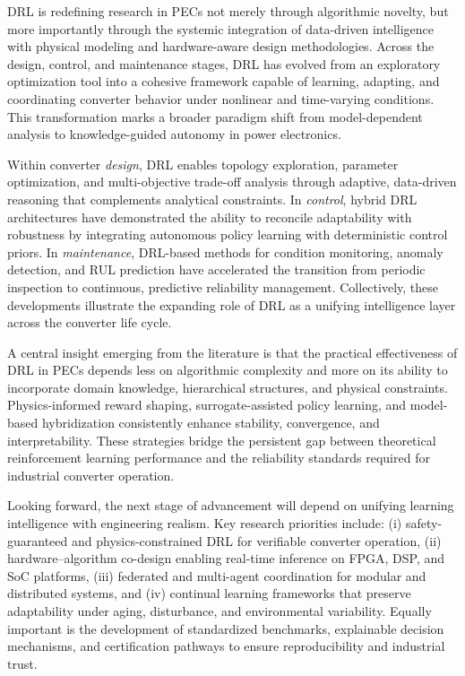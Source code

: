 
DRL is redefining research in PECs not merely through algorithmic novelty, but more importantly through the systemic integration of data-driven intelligence with physical modeling and hardware-aware design methodologies. Across the design, control, and maintenance stages, DRL has evolved from an exploratory optimization tool into a cohesive framework capable of learning, adapting, and coordinating converter behavior under nonlinear and time-varying conditions. This transformation marks a broader paradigm shift from model-dependent analysis to knowledge-guided autonomy in power electronics.

Within converter \textit{design}, DRL enables topology exploration, parameter optimization, and multi-objective trade-off analysis through adaptive, data-driven reasoning that complements analytical constraints. In \textit{control}, hybrid DRL architectures have demonstrated the ability to reconcile adaptability with robustness by integrating autonomous policy learning with deterministic control priors. In \textit{maintenance}, DRL-based methods for condition monitoring, anomaly detection, and RUL prediction have accelerated the transition from periodic inspection to continuous, predictive reliability management. Collectively, these developments illustrate the expanding role of DRL as a unifying intelligence layer across the converter life cycle.

A central insight emerging from the literature is that the practical effectiveness of DRL in PECs depends less on algorithmic complexity and more on its ability to incorporate domain knowledge, hierarchical structures, and physical constraints. Physics-informed reward shaping, surrogate-assisted policy learning, and model-based hybridization consistently enhance stability, convergence, and interpretability. These strategies bridge the persistent gap between theoretical reinforcement learning performance and the reliability standards required for industrial converter operation.

Looking forward, the next stage of advancement will depend on unifying learning intelligence with engineering realism. Key research priorities include: (i) safety-guaranteed and physics-constrained DRL for verifiable converter operation, (ii) hardware–algorithm co-design enabling real-time inference on FPGA, DSP, and SoC platforms, (iii) federated and multi-agent coordination for modular and distributed systems, and (iv) continual learning frameworks that preserve adaptability under aging, disturbance, and environmental variability. Equally important is the development of standardized benchmarks, explainable decision mechanisms, and certification pathways to ensure reproducibility and industrial trust.

